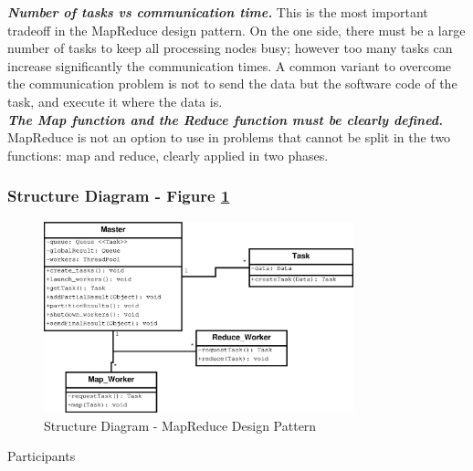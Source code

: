 \noindent\textbf{\textit{Number of tasks vs communication time. }}This is the most important tradeoff in the MapReduce design pattern. On the one side, there must be a large number of tasks to keep all processing nodes busy; however too many tasks can increase significantly the communication times. A common variant to overcome the communication problem is not to send the data but the software code of the task, and execute it where the data is.\\

\noindent\textbf{\textit{The Map function and the Reduce function must be clearly defined. }} MapReduce is not an option to use in problems that cannot be split in the two functions: map and reduce, clearly applied in two phases.

\subsubsection{Structure Diagram - Figure \ref{fig:str_diagram_map_reduce}}

\begin{figure}
	\centering
	\includegraphics*[width=0.8\textwidth, keepaspectratio=false]{fig/image27.eps}
	\caption{Structure Diagram - MapReduce Design Pattern}
	\label{fig:str_diagram_map_reduce}
\end{figure}

\begin{description}
	\item[Participants]
\end{description}

